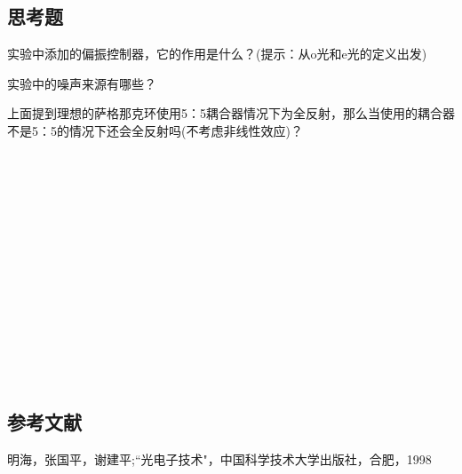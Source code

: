 \documentclass{zjureport}
\begin{document}
   \subsection{思考题}
   \begin{clause}
   	\item 实验中添加的偏振控制器，它的作用是什么？(提示：从o光和e光的定义出发)
   	\item 实验中的噪声来源有哪些？
   	\item 上面提到理想的萨格那克环使用5：5耦合器情况下为全反射，那么当使用的耦合器不是5：5的情况下还会全反射吗(不考虑非线性效应)？
   		~\\
   	~\\
   	~\\
   	~\\
   	~\\
   	~\\
   	~\\
   	~\\
   	~\\
   	~\\
   	~\\
   	~\\
   	~\\
   	~\\
   	~\\
   \end{clause}
\subsection{参考文献}
\begin{clause}
	
	\item 明海，张国平，谢建平;“光电子技术"，中国科学技术大学出版社，合肥，1998
\end{clause}
\end{document}
